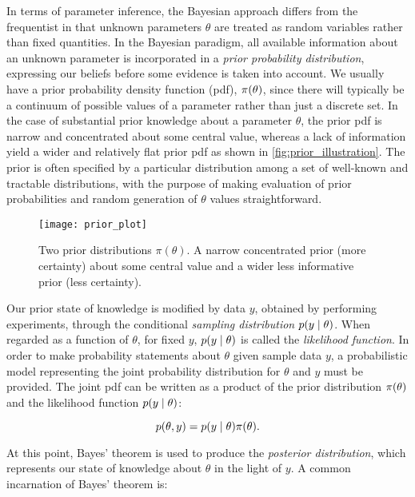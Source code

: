 In terms of parameter inference, the Bayesian approach differs from the frequentist in that unknown parameters $\theta$ are treated as random variables rather than fixed quantities. In the Bayesian paradigm, all available information about an unknown parameter is incorporated in a \textit{prior probability distribution}, expressing our beliefs before some evidence is taken into account. We usually have a prior probability density function (pdf), $\pi \qty(\theta)$, since there will typically be a continuum of possible values of a parameter rather than just a discrete set. In the case of substantial prior knowledge about a parameter $\theta$, the prior pdf is narrow and concentrated about some central value, whereas a lack of information yield a wider and relatively flat prior pdf as shown in \autoref{fig:prior_illustration}. The prior is often specified by a particular distribution among a set of well-known and tractable distributions, with the purpose of making evaluation of prior probabilities and random generation of $\theta$ values straightforward.

\begin{figure}[H]
    \centering
    \texttt{[image: prior\_plot]}
    \caption{Two prior distributions $\pi (\theta)$. A narrow concentrated prior (more certainty) about some central value and a wider less informative prior (less certainty).}
    \label{fig:prior_illustration}
\end{figure}

Our prior state of knowledge is modified by data $y$, obtained by performing experiments, through the conditional \textit{sampling distribution} $p \qty(y \mid \theta)$. When regarded as a function of $\theta$, for fixed $y$, $p \qty(y \mid \theta)$ is called the \textit{likelihood function}. In order to make probability statements about $\theta$ given sample data $y$, a probabilistic model representing the joint probability distribution for $\theta$ and $y$ must be provided. The joint pdf can be written as a product of the prior distribution $\pi \qty(\theta)$ and the likelihood function $p \qty(y \mid \theta)$:

\begin{equation*}
    p(\theta, y) = p \qty(y \mid \theta) \pi \qty(\theta) .
\end{equation*}

At this point, Bayes' theorem is used to produce the \textit{posterior distribution}, which represents our state of knowledge about $\theta$ in the light of $y$. A common incarnation of Bayes' theorem is:

